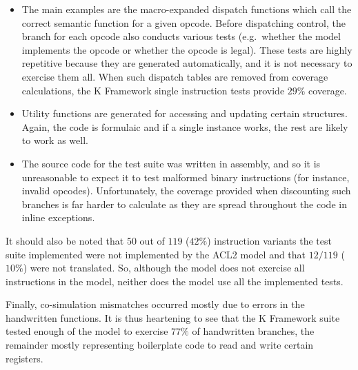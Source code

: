 \documentclass[a4paper,12pt,twoside,openright]{report}
\begin{document}
\begin{itemize}
  \item The main examples are the macro-expanded dispatch functions which call the correct semantic function for a given opcode.  Before dispatching control, the branch for each opcode also conducts various tests (e.g.~whether the model implements the opcode or whether the opcode is legal).  These tests are highly repetitive because they are generated automatically, and it is not necessary to exercise them all.  When such dispatch tables are removed from coverage calculations, the K Framework single instruction tests provide $29\%$ coverage.

  \item Utility functions are generated for accessing and updating certain structures.  Again, the code is formulaic and if a single instance works, the rest are likely to work as well.

  \item The source code for the test suite was written in assembly, and so it is unreasonable to expect it to test malformed binary instructions (for instance, invalid opcodes).  Unfortunately, the coverage provided when discounting such branches is far harder to calculate as they are spread throughout the code in inline exceptions.
\end{itemize}

It should also be noted that $50$ out of $119$ ($42\%$) instruction variants the test suite implemented were not implemented by the ACL2 model and that $12 / 119$ ($10\%$) were not translated.  So, although the model does not exercise all instructions in the model, neither does the model use all the implemented tests.

Finally, co-simulation mismatches occurred mostly due to errors in the handwritten functions.  It is thus heartening to see that the K Framework suite tested enough of the model to exercise $77\%$ of handwritten branches, the remainder mostly representing boilerplate code to read and write certain registers.


\end{document}
